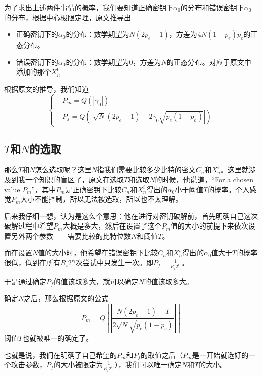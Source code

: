 \documentclass{article}
\begin{document}
为了求出上述两件事情的概率，我们要知道正确密钥下$\alpha_0$的分布和错误密钥下$\alpha_0$的分布，根据中心极限定理，原文推导出
\begin{itemize}
	\item 
	正确密钥下的$\alpha_0$的分布：数学期望为$N(2p_e-1)$，方差为$4N(1-p_e)p_e$的正态分布。
	\item 
	错误密钥下的$\alpha_0$的分布：数学期望为$0$，方差为$N$的正态分布。对应于原文中添加的那个$X_n^0$
\end{itemize}

根据原文的推导，我们知道
\begin{equation}
\left\{
\begin{aligned}
&P_m=Q(|\gamma_0|)\\
&P_f=Q(|\sqrt{N}(2p_e-1)-2\gamma_0\sqrt{p_e(1-p_e)}|)
\end{aligned}
\right.
\end{equation}


\subsection*{$T$和$N$的选取}


那么$T$和$N$怎么选取呢？这里$N$指我们需要比较多少比特的密文$C_n$和$X_n^i$。这里就涉及到我一个知识的盲区了，原文在选取$T$和选取$N$的时候，他说道，``For a chosen value $P_m$''，其中$P_m$是正确密钥下比较$C_n$和$X_n^i$得出的$\alpha_0$小于阈值$T$的概率。个人感觉$P_m$大小不能控制，所以无法被选取，所以也不太理解。

后来我仔细一想，认为是这么个意思：他在进行对密钥破解前，首先明确自己这次破解过程中希望$P_m$大概是多大，然后在设置了这个$P_m$值的大小的前提下来依次设置另外两个参数——需要比较的比特位数$N$和阈值$T$。

而在设置$N$值的大小时，他希望在错误密钥下比较$C_n$和$X_n^i$得出的$\alpha_0$值大于$T$的概率很低，低到在所有$R_i2^{r_i}$次尝试中只发生一次。即$P_f = \frac{1}{R_i2^{r_i}}$。

于是通过确定$P_f$的值该取多大，就可以确定$N$的值该取多大。

确定$N$之后，那么根据原文的公式
\[P_m= Q[|\frac{N(2p_e-1)-T}{2\sqrt{N}\sqrt{p_e(1-p_e)}}|]\]
阈值$T$也就被唯一的确定了。

也就是说，我们在明确了自己希望的$P_m$和$P_f$的取值之后（$P_m$是一开始就选好的一个攻击参数，$P_f$的大小被限定为$\frac{1}{R_i2^{r_i}}$），我们可以唯一确定$N$和$T$的大小。
\end{document}
